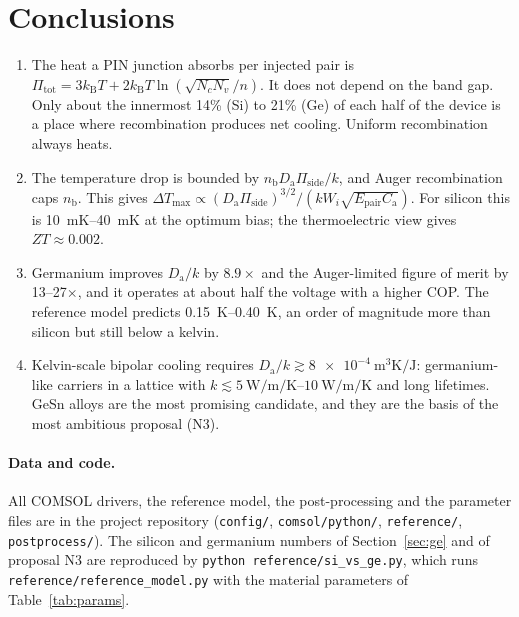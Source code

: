 \documentclass[11pt,a4paper]{article}
\newcommand{\kB}{k_{\mathrm{B}}}
\newcommand{\Ep}{E_{\mathrm{pair}}}
\newcommand{\Da}{D_{\mathrm{a}}}
\newcommand{\Ca}{C_{\mathrm{a}}}
\newcommand{\nb}{n_{\mathrm{b}}}
\newcommand{\Pis}{\Pi_{\mathrm{side}}}
\newcommand{\Pit}{\Pi_{\mathrm{tot}}}
\begin{document}
\section{Conclusions}
\begin{enumerate}
  \item The heat a PIN junction absorbs per injected pair is $\Pit=3\kB T+2\kB T\ln(\sqrt{N_cN_v}/n)$. It does not depend on the band gap. Only about the innermost 14\% (Si) to 21\% (Ge) of each half of the device is a place where recombination produces net cooling. Uniform recombination always heats.
  \item The temperature drop is bounded by $\nb\Da\Pis/k$, and Auger recombination caps $\nb$. This gives $\Delta T_{\max}\propto(\Da\Pis)^{3/2}/(kW_i\sqrt{\Ep\Ca})$. For silicon this is \SIrange{10}{40}{\milli\kelvin} at the optimum bias; the thermoelectric view gives $ZT\approx0.002$.
  \item Germanium improves $\Da/k$ by $8.9\times$ and the Auger-limited figure of merit by 13--27$\times$, and it operates at about half the voltage with a higher COP. The reference model predicts \SIrange{0.15}{0.40}{\kelvin}, an order of magnitude more than silicon but still below a kelvin.
  \item Kelvin-scale bipolar cooling requires $\Da/k\gtrsim\SI{8e-4}{\metre\cubed\kelvin\per\joule}$: germanium-like carriers in a lattice with $k\lesssim\SIrange{5}{10}{\watt\per\metre\per\kelvin}$ and long lifetimes. GeSn alloys are the most promising candidate, and they are the basis of the most ambitious proposal (N3).
\end{enumerate}

\paragraph{Data and code.} All COMSOL drivers, the reference model, the post-processing and the parameter files are in the project repository (\texttt{config/}, \texttt{comsol/python/}, \texttt{reference/}, \texttt{postprocess/}). The silicon and germanium numbers of Section~\ref{sec:ge} and of proposal N3 are reproduced by \texttt{python reference/si\_vs\_ge.py}, which runs \texttt{reference/reference\_model.py} with the material parameters of Table~\ref{tab:params}.
\end{document}
